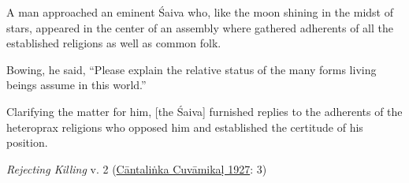 \begin{pullquote}
A man approached an eminent Śaiva who, like the moon shining in the midst of stars, appeared in the center of an assembly where gathered adherents of all the established religions as well as common folk.\medskip


Bowing, he said, “Please explain the relative status of the many forms living beings assume in this world.”\medskip


Clarifying the matter for him, [the Śaiva] furnished replies to the adherents of the heteroprax religions who opposed him and established the certitude of his position.\footnotemark{}


\medskip\hfill\begin{minipage}{0.9\textwidth}\small\hfill
\emph{Rejecting Killing} v. 2 (\hyperref[CantalinkaCuvamikal1927]{Cāntaliṅka Cuvāmikaḷ 1927}: 3)\end{minipage}\hspace{2em}
\end{pullquote}

